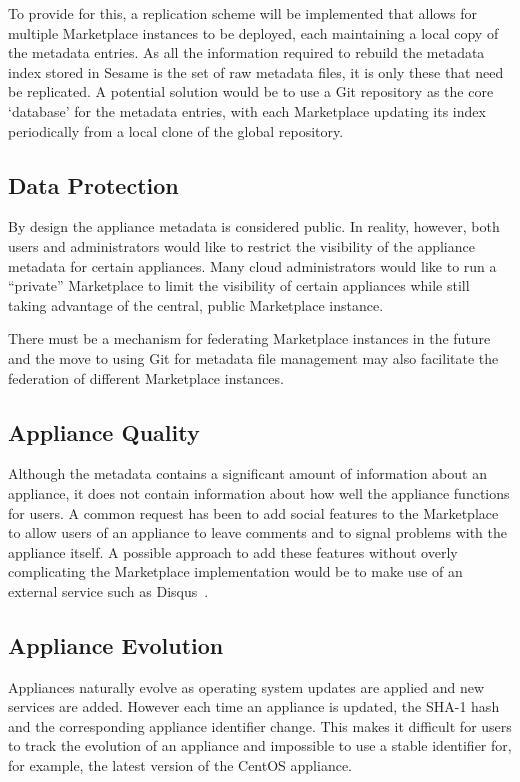 To provide for this, a replication scheme will be implemented that
allows for multiple Marketplace instances to be deployed, each
maintaining a local copy of the metadata entries. As all the
information required to rebuild the metadata index stored in Sesame is
the set of raw metadata files, it is only these that need be
replicated.  A potential solution would be to use a Git repository as
the core `database' for the metadata entries, with each Marketplace
updating its index periodically from a local clone of the global
repository.

\subsection{Data Protection}

By design the appliance metadata is considered public.  In reality,
however, both users and administrators would like to restrict the
visibility of the appliance metadata for certain appliances.  Many
cloud administrators would like to run a ``private'' Marketplace to
limit the visibility of certain appliances while still taking
advantage of the central, public Marketplace instance.

There must be a mechanism for federating Marketplace instances in the
future and the move to using Git for metadata file management may also
facilitate the federation of different Marketplace instances.

\subsection{Appliance Quality}

Although the metadata contains a significant amount of information
about an appliance, it does not contain information about how well the
appliance functions for users.  A common request has been to add
social features to the Marketplace to allow users of an appliance to
leave comments and to signal problems with the appliance itself.  A
possible approach to add these features without overly complicating
the Marketplace implementation would be to make use of an external
service such as Disqus~\cite{disqus}.

\subsection{Appliance Evolution}

Appliances naturally evolve as operating system updates are applied
and new services are added.  However each time an appliance is
updated, the SHA-1 hash and the corresponding appliance identifier
change.  This makes it difficult for users to track the evolution of
an appliance and impossible to use a stable identifier for, for
example, the latest version of the CentOS appliance.

